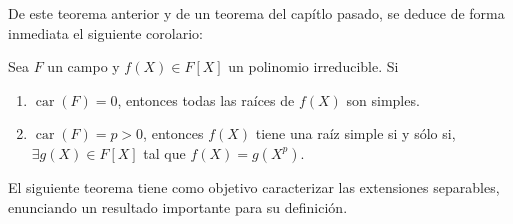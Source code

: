 \documentclass[12pt]{report}
\theoremstyle{largebreak}
\DeclareMathOperator{\car}{car}
\begin{document}
    De este teorema anterior y de un teorema del capítlo pasado, se deduce de forma inmediata el siguiente corolario:

    \begin{cor}
        Sea $F$ un campo y $f(X)\in F[X]$ un polinomio irreducible. Si
        \begin{enumerate}
            \item $\car(F)=0$, entonces todas las raíces de $f(X)$ son simples.
            \item $\car(F)=p>0$, entonces $f(X)$ tiene una raíz simple si y sólo si, $\exists g(X)\in F[X]$ tal que $f(X)=g(X^{p})$.
        \end{enumerate}
    \end{cor}

    El siguiente teorema tiene como objetivo caracterizar las extensiones separables, enunciando un resultado importante para su definición.
\end{document}
